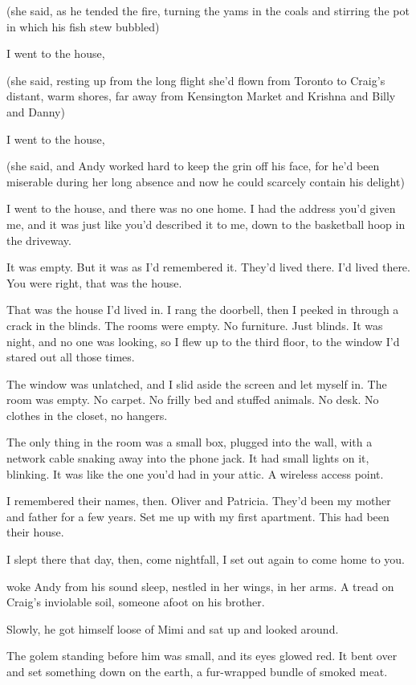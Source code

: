 (she said, as he tended the fire, turning the yams in the coals and
stirring the pot in which his fish stew bubbled)

I went to the house,

(she said, resting up from the long flight she'd flown from Toronto to
Craig's distant, warm shores, far away from Kensington Market and
Krishna and Billy and Danny)

I went to the house,

(she said, and Andy worked hard to keep the grin off his face, for
he'd been miserable during her long absence and now he could scarcely
contain his delight)

I went to the house, and there was no one home.  I had the address
you'd given me, and it was just like you'd described it to me, down to
the basketball hoop in the driveway.

It was empty.  But it was as I'd remembered it.  They'd lived there. 
I'd lived there.  You were right, that was the house.

That was the house I'd lived in.  I rang the doorbell, then I peeked
in through a crack in the blinds.  The rooms were empty.  No
furniture.  Just blinds.  It was night, and no one was looking, so I
flew up to the third floor, to the window I'd stared out all those
times.

The window was unlatched, and I slid aside the screen and let myself
in.  The room was empty.  No carpet.  No frilly bed and stuffed
animals.  No desk.  No clothes in the closet, no hangers.

The only thing in the room was a small box, plugged into the wall,
with a network cable snaking away into the phone jack.  It had small
lights on it, blinking.  It was like the one you'd had in your attic. 
A wireless access point.

I remembered their names, then.  Oliver and Patricia.  They'd been my
mother and father for a few years.  Set me up with my first apartment. 
This had been their house. 

I slept there that day, then, come nightfall, I set out again to come
home to you.

 woke Andy from his sound sleep, nestled in her wings, in her
arms.  A tread on Craig's inviolable soil, someone afoot on his
brother.

Slowly, he got himself loose of Mimi and sat up and looked around. 

The golem standing before him was small, and its eyes glowed red.  It
bent over and set something down on the earth, a fur-wrapped bundle of
smoked meat. 

